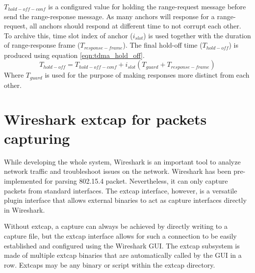 \documentclass[\main/main.tex]{subfiles}
\begin{document}
$T_{hold-off-conf}$ is a configured value for holding the range-request message before send the range-response message.
As many anchors will response for a range-request, all anchors should respond at different time to not corrupt each other. To archive this, time slot index of anchor ($i_{slot}$) is used together with the duration of range-response frame ($T_{response-frame}$). The final hold-off time ($T_{hold-off}$) is produced using equation \ref{eqn:tdma_hold_off}.
\begin{equation}
   T_{hold-off} = T_{hold-off-conf} + i_{slot}(T_{guard} + T_{response-frame})
   \label{eqn:tdma_hold_off}
\end{equation}
Where $T_{guard}$ is used for the purpose of making responses more distinct from each other.



\section{Wireshark extcap for packets capturing}
While developing the whole system, Wireshark is an important tool to analyze network traffic and troubleshoot issues on the network. Wireshark has been pre-implemented for parsing 802.15.4 packet. Nevertheless, it can only capture packets from standard interfaces. The extcap interface, however, is a versatile plugin interface that allows external binaries to act as capture interfaces directly in Wireshark.

Without extcap, a capture can always be achieved by directly writing to a capture file, but the extcap interface allows for such a connection to be easily established and configured using the Wireshark GUI. The extcap subsystem is made of multiple extcap binaries that are automatically called by the GUI in a row. Extcaps may be any binary or script within the extcap directory.
\end{document}
